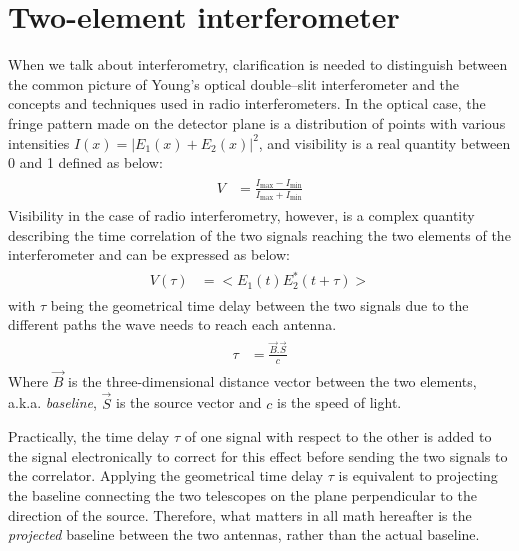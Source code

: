 \documentclass[a4wide,12pt]{book}
\begin{document}
{\section{Two-element interferometer}
When we talk about interferometry, clarification is needed to distinguish between the common picture of Young's optical double--slit interferometer and the concepts and techniques used in radio interferometers. In the optical case, the fringe pattern made on the detector plane is a distribution of points with various intensities $I(x) = |E_1(x) + E_2(x)|^2$, and visibility is a real quantity between 0 and 1 defined as below:
\begin{align} 
\begin{split}
V &= \frac{I_\mathrm{max} - I_\mathrm{min}}{I_\mathrm{max} + I_\mathrm{min}}
\end{split}                    
\end{align}
Visibility in the case of radio interferometry, however, is a complex quantity describing the time correlation of the two signals reaching the two elements of the interferometer and can be expressed as below:
\begin{align} 
\begin{split}
\label{eq:vis_def}
V(\tau) &= <E_1(t)E_2^*(t+\tau)>
\end{split}                    
\end{align}
with $\tau$ being the geometrical time delay between the two signals due to the different paths the wave needs to reach each antenna.
\begin{align} 
\begin{split}
\tau &= \frac{\vec{B}.\vec{S}}{c}
\end{split}                    
\end{align}
Where $\vec{B}$ is the three-dimensional distance vector between the two elements, a.k.a. \emph{baseline}, $\vec{S}$ is the source vector and $c$ is the speed of light.

Practically, the time delay $\tau$ of one signal with respect to the other is added to the signal electronically to correct for this effect before sending the two signals to the correlator. Applying the geometrical time delay $\tau$ is equivalent to projecting the baseline connecting the two telescopes on the plane perpendicular to the direction of the source. Therefore, what matters in all math hereafter is the \emph{projected} baseline between the two antennas, rather than the actual baseline. 

}
\end{document}

